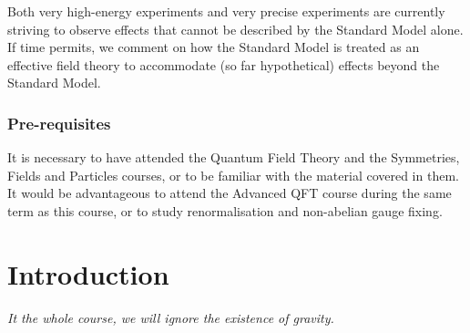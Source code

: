 \documentclass[a4paper]{article}
\begin{document}
{Both very high-energy experiments and very precise experiments are currently striving to observe effects that cannot be described by the Standard Model alone. If time permits, we comment on how the Standard Model is treated as an effective field theory to accommodate (so far hypothetical) effects beyond the Standard Model.

\subsubsection*{Pre-requisites}
It is necessary to have attended the Quantum Field Theory and the Symmetries, Fields and Particles courses, or to be familiar with the material covered in them. It would be advantageous to attend the Advanced QFT course during the same term as this course, or to study renormalisation and non-abelian gauge fixing.
}
\tableofcontents

\section{Introduction}
\emph{It the whole course, we will ignore the existence of gravity.}
\end{document}
